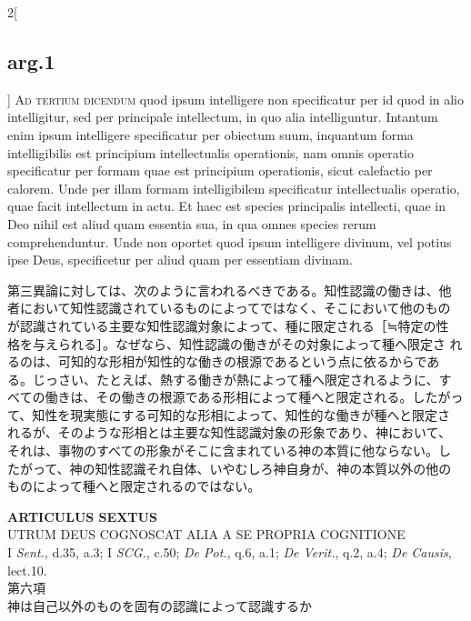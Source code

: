\documentclass[paper=a4paper,fontsize=10pt,jafontsize=9pt,titlepage]{jlreq}
\begin{document}
\begin{paracol}{2}[\subsection{arg.1}]
{\scshape Ad tertium dicendum} quod ipsum intelligere non specificatur
per id quod in alio intelligitur, sed per principale intellectum, in
quo alia intelliguntur. Intantum enim ipsum intelligere specificatur
per obiectum suum, inquantum forma intelligibilis est principium
intellectualis operationis, nam omnis operatio specificatur per formam
quae est principium operationis, sicut calefactio per calorem. Unde
per illam formam intelligibilem specificatur intellectualis operatio,
quae facit intellectum in actu. Et haec est species principalis
intellecti, quae in Deo nihil est aliud quam essentia sua, in qua
omnes species rerum comprehenduntur. Unde non oportet quod ipsum
intelligere divinum, vel potius ipse Deus, specificetur per aliud quam
per essentiam divinam.

\switchcolumn

第三異論に対しては、次のように言われるべきである。知性認識の働きは、他
者において知性認識されているものによってではなく、そこにおいて他のもの
が認識されている主要な知性認識対象によって、種に限定される［≒特定の性
格を与えられる］。なぜなら、知性認識の働きがその対象によって種へ限定さ
れるのは、可知的な形相が知性的な働きの根源であるという点に依るからであ
る。じっさい、たとえば、熱する働きが熱によって種へ限定されるように、す
べての働きは、その働きの根源である形相によって種へと限定される。したがっ
て、知性を現実態にする可知的な形相によって、知性的な働きが種へと限定さ
れるが、そのような形相とは主要な知性認識対象の形象であり、神において、
それは、事物のすべての形象がそこに含まれている神の本質に他ならない。し
たがって、神の知性認識それ自体、いやむしろ神自身が、神の本質以外の他の
ものによって種へと限定されるのではない。

\end{paracol}


\newpage


{}
\setcounter{section}{6}
\setcounter{subsection}{0}
\begin{center}
{\Large {\bfseries ARTICULUS SEXTUS}}\\ {\large UTRUM DEUS COGNOSCAT ALIA A
SE PROPRIA COGNITIONE}\\ {\footnotesize I {\itshape Sent.}, d.35,
a.3; I {\itshape SCG.}, c.50; {\itshape De Pot.}, q.6, a.1;
{\itshape De Verit.}, q.2, a.4; {\itshape De Causis}, lect.10.}\\
{\Large 第六項\\神は自己以外のものを固有の認識によって認識するか}
\end{center}
\end{document}
